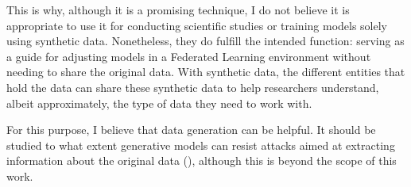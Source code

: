 This is why, although it is a promising technique, I do not believe it is appropriate to use it for conducting scientific studies or training models solely using synthetic data. Nonetheless, they do fulfill the intended function: serving as a guide for adjusting models in a Federated Learning environment without needing to share the original data. With synthetic data, the different entities that hold the data can share these synthetic data to help researchers understand, albeit approximately, the type of data they need to work with.

For this purpose, I believe that data generation can be helpful. It should be studied to what extent generative models can resist attacks aimed at extracting information about the original data (\cite*{sun2023}), although this is beyond the scope of this work.
